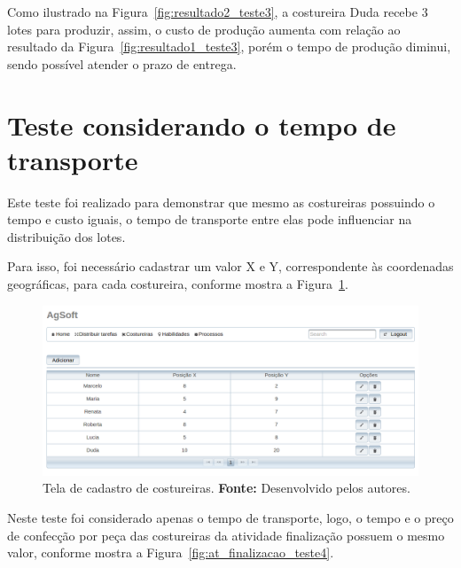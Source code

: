 \par Como ilustrado na Figura~\ref{fig:resultado2_teste3}, a costureira Duda
recebe 3 lotes para produzir, assim, o custo de produção aumenta com relação ao 
resultado da Figura~\ref{fig:resultado1_teste3}, porém o tempo de produção
diminui, sendo possível atender o prazo de entrega.


\section{Teste considerando o tempo de transporte}

\par Este teste foi realizado para demonstrar que mesmo as costureiras possuindo
o tempo e custo iguais, o tempo de transporte entre elas pode influenciar na distribuição dos lotes.

\par Para isso, foi necessário cadastrar um valor X e Y, correspondente às
coordenadas geográficas, para cada costureira, conforme mostra a Figura~\ref{fig:add_xy_costureira_teste4}.


\begin{figure}[h!]
	\centerline{\includegraphics[width=14.7cm]{./imagens/posicao_xy_costureiras_teste4.png}}
	\caption[Tela de cadastro de costureiras.]
	{Tela de cadastro de costureiras. \textbf{Fonte:} Desenvolvido pelos autores.}
	\label{fig:add_xy_costureira_teste4}
\end{figure}


\par Neste teste foi considerado apenas o tempo de transporte, logo, o tempo e o
preço de confecção por peça das costureiras da atividade finalização possuem o
mesmo valor, conforme mostra a Figura~\ref{fig:at_finalizacao_teste4}.


